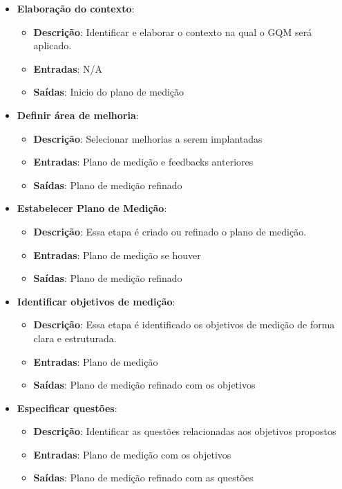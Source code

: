 \begin{itemize}
  \item \textbf{Elaboração do contexto}:
  \begin{itemize}
    \item \textbf{Descrição}: Identificar e elaborar o contexto na qual o GQM será aplicado.
    \item \textbf{Entradas}: N/A
    \item \textbf{Saídas}: Inicio do plano de medição
  \end{itemize}
  \item \textbf{Definir área de melhoria}:
  \begin{itemize}
    \item \textbf{Descrição}: Selecionar melhorias a serem implantadas
    \item \textbf{Entradas}: Plano de medição e feedbacks anteriores
    \item \textbf{Saídas}: Plano de medição refinado
  \end{itemize}
  \item \textbf{Estabelecer Plano de Medição}:
  \begin{itemize}
    \item \textbf{Descrição}: Essa etapa é criado ou refinado o plano de medição.
    \item \textbf{Entradas}: Plano de medição se houver
    \item \textbf{Saídas}: Plano de medição refinado
  \end{itemize}
  \item \textbf{Identificar objetivos de medição}:
  \begin{itemize}
    \item \textbf{Descrição}: Essa etapa é identificado os objetivos de medição de forma clara e estruturada.
    \item \textbf{Entradas}: Plano de medição
    \item \textbf{Saídas}: Plano de medição refinado com os objetivos
  \end{itemize}
  \item \textbf{Especificar questões}:
  \begin{itemize}
    \item \textbf{Descrição}: Identificar as questões relacionadas aos objetivos propostos
    \item \textbf{Entradas}: Plano de medição com os objetivos
    \item \textbf{Saídas}: Plano de medição refinado com as questões

\end{itemize}
\end{itemize}
